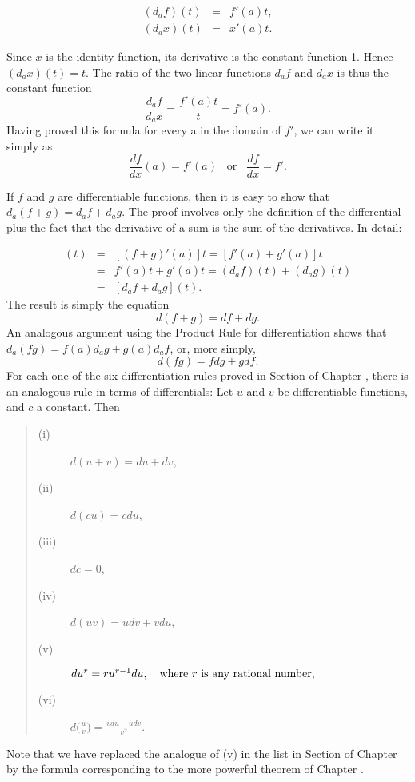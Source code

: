 \begin{example}
\begin{eqnarray*}
(d_{a}f)(t) &=& f'(a)t, \\
(d_{a}x)(t) &=& x'(a)t.
\end{eqnarray*}

\noindent Since $x$ is the identity function, its derivative is the constant function 1. Hence $(d_{a}x)(t) = t.$ The ratio of the two linear functions $d_{a}f$ and $d_{a}x$ is thus the constant function
$$
\frac{d_{a}f}{d_{a}x} = \frac{f'(a)t}{t} = f'(a).
$$
Having proved this formula for every a in the domain of $f'$, we can write it simply as
$$
\frac{df}{dx} (a) = f'(a) \;\;\; \mbox{or} \;\;\; \frac{df}{dx} = f'.
$$

If $f$ and $g$ are differentiable functions, then it is easy to show that $d_{a}(f + g) = d_{a}f + d_{a}g$. The proof involves only the definition of the differential plus the fact that the derivative of a sum is the sum of the derivatives. In detail:

\begin{eqnarray*}
[d_{a}(f + g)](t) &=& [(f + g)'(a)] t = [f' (a) + g'(a)] t\\
                         &=& f'(a)t + g'(a)t = (d_{a}f)(t) + (d_{a}g)(t)\\
                         &=& [d_{a}f + d_{a}g](t) .
\end{eqnarray*}
The result is simply the equation
$$
d(f + g) = df + dg.
$$
An analogous argument using the Product Rule for differentiation shows that $d_{a}(fg) = f(a)d_{a}g + g(a)d_{a}f$, or, more simply,
$$
d(fg) = f dg + g df.
$$
For each one of the six differentiation rules 
proved in Section  of Chapter ,
there is an analogous rule in terms of differentials:
Let $u$ and $v$ be differentiable functions, and $c$ a constant. Then
\begin{prop}
\label{thm drules}
\begin{quote}
\begin{description}
\item [(i)] $d(u + v) = du + dv$,
\item [(ii)] $d(cu)= cdu$,
\item [(iii)] $dc= 0$,
\item [(iv)] $d(uv) = u dv + v du$,
\item [(v)]
$du^r = ru^{r-1}du, \quad \mbox{where $r$ is any rational number,}$  
\item [(vi)] $d \biggl(\frac{u}{v} \biggr) = \frac{vdu - udv}{v^2}$.
\end{description}
\end{quote} 
\end{prop}

Note that we have replaced the analogue of (v)
in the list in Section  of Chapter 
by the formula corresponding to the more powerful theorem
 of Chapter .
\end{example}


